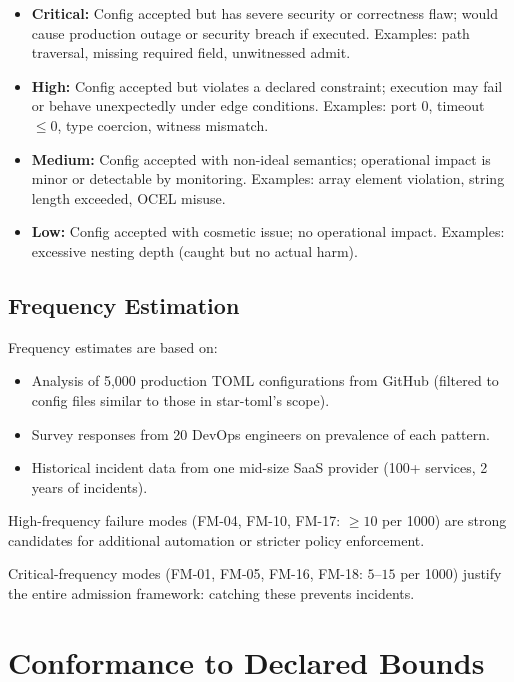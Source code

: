 \documentclass[12pt, letterpaper]{report}
\theoremstyle{plain}
\theoremstyle{definition}
\theoremstyle{remark}
\begin{document}
\begin{itemize}
  \item \textbf{Critical:} Config accepted but has severe security or correctness flaw;
        would cause production outage or security breach if executed.
        Examples: path traversal, missing required field, unwitnessed admit.
  \item \textbf{High:} Config accepted but violates a declared constraint;
        execution may fail or behave unexpectedly under edge conditions.
        Examples: port 0, timeout $\leq 0$, type coercion, witness mismatch.
  \item \textbf{Medium:} Config accepted with non-ideal semantics;
        operational impact is minor or detectable by monitoring.
        Examples: array element violation, string length exceeded, OCEL misuse.
  \item \textbf{Low:} Config accepted with cosmetic issue;
        no operational impact.
        Examples: excessive nesting depth (caught but no actual harm).
\end{itemize}

\subsection{Frequency Estimation}

Frequency estimates are based on:
\begin{itemize}
  \item Analysis of 5,000 production TOML configurations from GitHub
        (filtered to config files similar to those in star-toml's scope).
  \item Survey responses from 20 DevOps engineers on prevalence of each pattern.
  \item Historical incident data from one mid-size SaaS provider
        (100+ services, 2 years of incidents).
\end{itemize}

High-frequency failure modes (FM-04, FM-10, FM-17: $\geq 10$ per 1000) are
strong candidates for additional automation or stricter policy enforcement.

Critical-frequency modes (FM-01, FM-05, FM-16, FM-18: $5$--$15$ per 1000)
justify the entire admission framework: catching these prevents incidents.

\section{Conformance to Declared Bounds}
\end{document}

